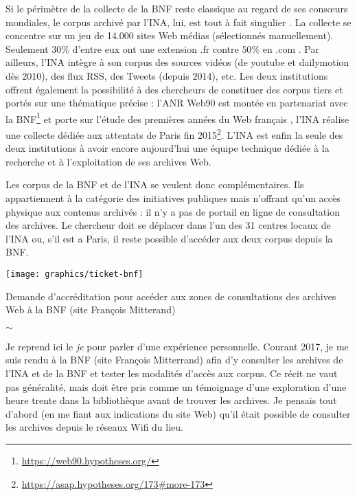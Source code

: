 \documentclass[symmetric,justified,marginals=raggedouter]{tufte-book}
\begin{document}
\noindent Si le périmètre de la collecte de la BNF reste classique au regard de ses consœurs mondiales, le corpus archivé par l'INA, lui, est tout à fait singulier \citep{mussou_et_2012}. La collecte se concentre sur un jeu de 14.000 sites Web médias (sélectionnés manuellement). Seulement $30\%$ d'entre eux ont une extension .fr contre $50\%$ en .com \citep{drugeon_technical_2005}. Par ailleurs, l'INA intègre à son corpus des sources vidéos (de youtube et dailymotion dès 2010), des flux RSS, des Tweets (depuis 2014), etc. Les deux institutions offrent également la possibilité à des chercheurs de constituer des corpus tiers et portés sur une thématique précise : l'ANR Web90 est montée en partenariat avec la BNF\footnote{\RaggedOuter \url{https://web90.hypotheses.org/}} et porte sur l'étude des premières années du Web français \citep{schafer_web_2016}, l'INA réalise une collecte dédiée aux attentats de Paris fin 2015\footnote{\RaggedOuter \url{https://asap.hypotheses.org/173\#more-173}}. L'INA est enfin la seule des deux institutions à avoir encore aujourd'hui une équipe technique dédiée à la recherche et à l'exploitation de ses archives Web.

Les corpus de la BNF et de l'INA se veulent donc complémentaires. Ils appartiennent à la catégorie des initiatives publiques mais n'offrant qu'un accès physique aux contenus archivés : il n'y a pas de portail en ligne de consultation des archives. Le chercheur doit se déplacer dans l'un des 31 centres locaux de l'INA ou, s'il est a Paris, il reste possible d'accéder aux deux corpus depuis la BNF.

\begin{marginfigure}%
  \texttt{[image: graphics/ticket-bnf]}
  \vspace*{0.2cm}  
  \caption{Demande d'accréditation pour accéder aux zones de consultations des archives Web à la BNF (site François Mitterand)}
  \label{fig:ticket-bnf}
\end{marginfigure} 

\begin{center}
	$\sim$
\end{center}

\noindent Je reprend ici le \textit{je} pour parler d'une expérience personnelle. Courant 2017, je me suis rendu à la BNF (site François Mitterrand) afin d'y consulter les archives de l'INA et de la BNF et tester les modalités d'accès aux corpus. Ce récit ne vaut pas généralité, mais doit être pris comme un témoignage d'une exploration d'une heure trente dans la bibliothèque avant de trouver les archives. Je pensais tout d'abord (en me fiant aux indications du site Web) qu'il était possible de consulter les archives depuis le réseaux Wifi du lieu. 
\end{document}
